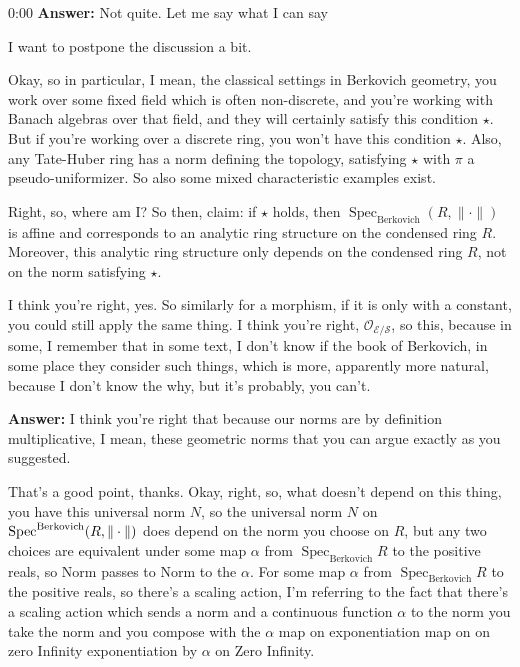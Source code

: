 \begin{unfinished}{0:00}
\textbf{Answer:} Not quite. Let me say what I can say 

I want to postpone the discussion a bit.

Okay, so in particular, I mean, the classical settings in Berkovich geometry, you work over some fixed field which is often non-discrete, and you're working with Banach algebras over that field, and they will certainly satisfy this condition $\star$. But if you're working over a discrete ring, you won't have this condition $\star$. 
Also, any Tate-Huber ring has a norm defining the topology, satisfying $\star$ with $\pi$ a pseudo-uniformizer. 
So also some mixed characteristic examples exist.

Right, so, where am I? So then, claim: if $\star$ holds, then $\operatorname{Spec}_{\mathrm{Berkovich}} (R, \|\cdot\|)$ is affine and corresponds to an analytic ring structure on the condensed ring $R$. Moreover, this analytic ring structure only depends on the condensed ring $R$, not on the norm satisfying $\star$.

I think you're right, yes. So similarly for a morphism, if it is only with a constant, you could still apply the same thing. I think you're right, $\mathcal{O}_{\mathcal{E}/\mathcal{S}}$, so this, because in some, I remember that in some text, I don't know if the book of Berkovich, in some place they consider such things, which is more, apparently more natural, because I don't know the why, but it's probably, you can't.

\textbf{Answer:} I think you're right that because our norms are by definition multiplicative, I mean, these geometric norms that you can argue exactly as you suggested.

That's a good point, thanks. Okay, right, so, what doesn't depend on this thing, you have this universal norm $N$, so the universal norm $N$ on $\operatorname{Spec}^{\mathrm{Berkovich}} (R, \| \cdot \|)$ does depend on the norm you choose on $R$, but any two choices are equivalent under some map $\alpha$ from $\operatorname{Spec}_{\mathrm{Berkovich}} R$ to the positive reals, so Norm passes to Norm to the $\alpha$. For some map $\alpha$ from $\operatorname{Spec}_{\mathrm{Berkovich}} R$ to the positive reals, so there's a scaling action, I'm referring to the fact that there's a scaling action which sends a norm and a continuous function $\alpha$ to the norm you take the norm and you compose with the $\alpha$ map on exponentiation map on on zero Infinity exponentiation by $\alpha$ on Zero Infinity.


\end{unfinished}
